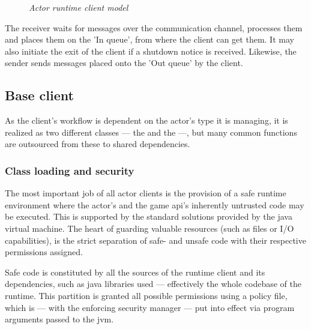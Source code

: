 \begin{figure}[h]
		\caption*{\emph{Actor runtime client model}}
	\end{figure}
	
	The receiver waits for messages over the communication channel, processes them and places them on the 'In queue', from where the client can get them. It may also initiate the exit of the client if a shutdown notice is received. Likewise, the sender sends messages placed onto the 'Out queue' by the client.
	
		\subsection{Base client}

			As the client's workflow is dependent on the actor's type it is managing, it is realized as two different classes --- the  and the  ---, but many common functions are outsourced from these to shared dependencies.

			\subsubsection*{Class loading and security}
		
			The most important job of all actor clients is the provision of a safe runtime environment where the actor's and the game api's inherently untrusted code may be executed. This is supported by the standard solutions provided by the java virtual machine. The heart of guarding valuable resources (such as files or \mbox{I/O} capabilities), is the strict separation of safe- and unsafe code with their respective permissions assigned.
			
			Safe code is constituted by all the sources of the runtime client and its dependencies, such as java libraries used --- effectively the whole codebase of the runtime. This partition is granted all possible permissions using a policy file, which is --- with the enforcing security manager --- put into effect via program arguments passed to the jvm.

